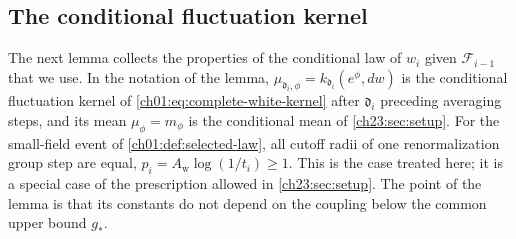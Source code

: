\subsection{The conditional fluctuation kernel}

The next lemma collects the properties of the conditional law of $w_i$ given $\mathcal F_{i-1}$ that we use. In the notation of the lemma, $\mu_{\mathfrak d_i,\phi}=k_{\mathfrak d_i}(e^\phi,dw)$ is the conditional fluctuation kernel of \eqref{ch01:eq:complete-white-kernel} after $\mathfrak d_i$ preceding averaging steps, and its mean $\mu_\phi=m_\phi$ is the conditional mean of \cref{ch23:sec:setup}. For the small-field event of \cref{ch01:def:selected-law}, all cutoff radii of one renormalization group step are equal, $p_i=A_{\mathrm w}\log(1/t_i)\ge1$. This is the case treated here; it is a special case of the prescription allowed in \cref{ch23:sec:setup}. The point of the lemma is that its constants do not depend on the coupling below the common upper bound $g_*$.

